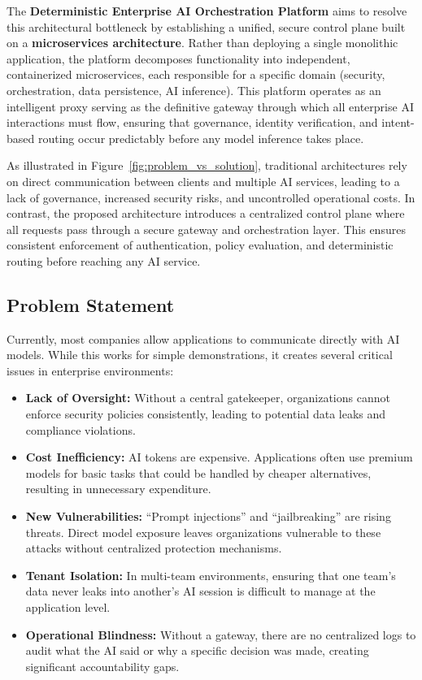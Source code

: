 The \textbf{Deterministic Enterprise AI Orchestration Platform} aims to resolve this architectural bottleneck by establishing a unified, secure control plane built on a \textbf{microservices architecture}. Rather than deploying a single monolithic application, the platform decomposes functionality into independent, containerized microservices, each responsible for a specific domain (security, orchestration, data persistence, AI inference). This platform operates as an intelligent proxy serving as the definitive gateway through which all enterprise AI interactions must flow, ensuring that governance, identity verification, and intent-based routing occur predictably before any model inference takes place.

As illustrated in Figure~\ref{fig:problem_vs_solution}, traditional architectures rely on direct communication between clients and multiple AI services, leading to a lack of governance, increased security risks, and uncontrolled operational costs. In contrast, the proposed architecture introduces a centralized control plane where all requests pass through a secure gateway and orchestration layer. This ensures consistent enforcement of authentication, policy evaluation, and deterministic routing before reaching any AI service.

\subsection{Problem Statement}
Currently, most companies allow applications to communicate directly with AI models. While this works for simple demonstrations, it creates several critical issues in enterprise environments:
\begin{itemize}[leftmargin=0.5cm, label=\textbullet, nosep]
    \item \textbf{Lack of Oversight:} Without a central gatekeeper, organizations cannot enforce security policies consistently, leading to potential data leaks and compliance violations.
    
    \item \textbf{Cost Inefficiency:} AI tokens are expensive. Applications often use premium models for basic tasks that could be handled by cheaper alternatives, resulting in unnecessary expenditure.
    
    \item \textbf{New Vulnerabilities:} ``Prompt injections'' and ``jailbreaking'' are rising threats. Direct model exposure leaves organizations vulnerable to these attacks without centralized protection mechanisms.
    
    \item \textbf{Tenant Isolation:} In multi-team environments, ensuring that one team's data never leaks into another's AI session is difficult to manage at the application level.
    
    \item \textbf{Operational Blindness:} Without a gateway, there are no centralized logs to audit what the AI said or why a specific decision was made, creating significant accountability gaps.
\end{itemize}

